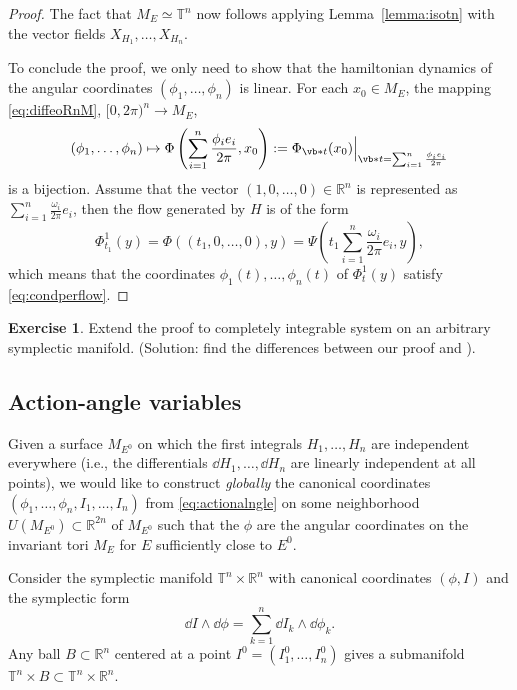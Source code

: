 \documentclass[english,fontsize=11pt,paper=b5]{scrbook}
\theoremstyle{definition}
\newtheorem{exercise}{Exercise}[chapter]
\begin{document}
\begin{proof}
        The fact that $M_E\simeq \mathbb{T}^n$ now follows applying Lemma~\ref{lemma:isotn} with the vector fields $X_{H_1}, \ldots, X_{H_n}$.

        To conclude the proof, we only need to show that the hamiltonian dynamics of the angular coordinates $(\phi_1, \ldots, \phi_n)$ is linear.
        For each $x_0\in M_E$, the mapping \eqref{eq:diffeoRnM}, $[0, 2\pi)^n \to M_E$,
        \begin{equation}
          (\phi_1, \ldots, \phi_n)\mapsto \Phi\left(\sum_{i=1}^n \frac{\phi_i e_i}{2\pi}, x_0\right) := \Phi_{\vb* t}(x_0)\Big|_{\vb* t = \sum_{i=1}^n \frac{\phi_i e_i}{2\pi}}
        \end{equation}
        is a bijection.
        Assume that the vector $(1, 0, \ldots, 0)\in\mathbb{R}^n$ is represented as $\sum_{i=1}^n \frac{\omega_i}{2\pi} e_i$, then the flow generated by $H$ is of the form
        \begin{equation}
          \Phi^1_{t_1}(y) = \Phi((t_1, 0, \ldots, 0), y)
          = \Psi\left(t_1 \sum_{i=1}^n \frac{\omega_i}{2\pi}e_i, y\right),
        \end{equation}
        which means that the coordinates $\phi_1(t), \ldots, \phi_n(t)$ of $\Phi_t^1(y)$ satisfy \eqref{eq:condperflow}.
      \end{proof}

      \begin{exercise}
        Extend the proof to completely integrable system on an arbitrary symplectic manifold. (Solution: find the differences between our proof and \cite[Theorem 13.3]{book:knauf}).
      \end{exercise}

      \subsection{Action-angle variables}

      Given a surface $M_{E^0}$ on which the first integrals $H_1, \ldots, H_n$ are independent everywhere (i.e., the differentials $\dd H_1, \ldots, \dd H_n$ are linearly independent at all points), we would like to construct \emph{globally} the canonical coordinates $(\phi_1, \ldots, \phi_n, I_1, \ldots, I_n)$ from \eqref{eq:actionalngle} on some neighborhood $U(M_{E^0})\subset \mathbb{R}^{2n}$ of $M_{E^0}$ such that the $\phi$ are the angular coordinates on the invariant tori $M_E$ for $E$ sufficiently close to $E^0$.

      Consider the symplectic manifold $\mathbb{T}^n \times \mathbb{R}^n$ with canonical coordinates $(\phi, I)$ and the symplectic form
      \begin{equation}
        \dd I \wedge \dd \phi = \sum_{k=1}^n \dd I_k \wedge \dd \phi_k.
      \end{equation}
      Any ball $B\subset\mathbb{R}^n$ centered at a point $I^0 = (I^0_1, \ldots, I^0_n)$ gives a submanifold $\mathbb{T}^n\times B \subset \mathbb{T}^n \times \mathbb{R}^n$.
\end{document}
